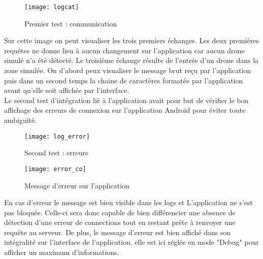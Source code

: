 \begin{figure}[!h]
  \centering
  \texttt{[image: logcat]}  
  \caption{Premier test : communication}
\end{figure}

Sur cette image on peut visualiser les trois premiers échanges. Les deux premières requêtes ne donne lieu à aucun changement sur l'application car aucun drone simulé n'a été détecté.
Le troisième échange résulte de l'entrée d'un drone dans la zone simulée. On d'abord peux visualiser le message brut reçu par l'application puis dans un second temps la chaine de caractères formatée par l'application avant qu'elle soit affichée par l'interface.
~\\
Le second test d'intégration lié à l'application avait pour but de vérifier le bon affichage des erreurs de connexion sur l'application Android pour éviter toute ambiguïté. 

\begin{figure}[!h]
  \centering
  \texttt{[image: log\_error]}  
  \caption{Second test : erreurs}
\end{figure}

\newpage %

\begin{wrapfigure}{r}{0.5\textwidth}

  \texttt{[image: error\_co]}
  \caption{Message d'erreur sur l'application}
\end{wrapfigure}

En cas d'erreur le message est bien visible dans les logs et L'application ne s'est pas bloquée. Celle-ci sera donc capable de bien différencier une absence de détection d'une erreur de connections tout en restant prête à renvoyer une requête au serveur. De plus, le message d'erreur est bien affiché dans son intégralité sur l'interface de l'application. elle est ici réglée en mode "Debug" pour afficher un maximum d'informations.



